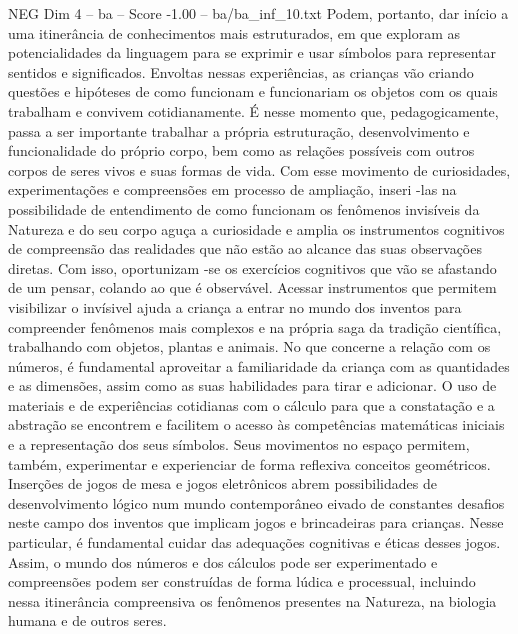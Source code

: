 \begin{textsample}{NEG Dim 4 – ba – Score -1.00 – ba/ba\_inf\_10.txt}
Podem, portanto, dar início a uma itinerância de conhecimentos mais estruturados, em que exploram as potencialidades da linguagem para se exprimir e usar símbolos para representar sentidos e significados.
Envoltas nessas experiências, as crianças vão criando questões e hipóteses de como funcionam e funcionariam os objetos com os quais trabalham e convivem cotidianamente.
É nesse momento que, pedagogicamente, passa a ser importante trabalhar a própria estruturação, desenvolvimento e funcionalidade do próprio corpo, bem como as relações possíveis com outros corpos de seres vivos e suas formas de vida.
Com esse movimento de curiosidades, experimentações e compreensões em processo de ampliação, inseri -las na possibilidade de entendimento de como funcionam os fenômenos invisíveis da Natureza e do seu corpo aguça a curiosidade e amplia os instrumentos cognitivos de compreensão das realidades que não estão ao alcance das suas observações diretas.
Com isso, oportunizam -se os exercícios cognitivos que vão se afastando de um pensar, colando ao que é observável.
Acessar instrumentos que permitem visibilizar o invísivel ajuda a criança a entrar no mundo dos inventos para compreender fenômenos mais complexos e na própria saga da tradição científica, trabalhando com objetos, plantas e animais.
No que concerne a relação com os números, é fundamental aproveitar a familiaridade da criança com as quantidades e as dimensões, assim como as suas habilidades para tirar e adicionar.
O uso de materiais e de experiências cotidianas com o cálculo para que a constatação e a abstração se encontrem e facilitem o acesso às competências matemáticas iniciais e a representação dos seus símbolos.
Seus movimentos no espaço permitem, também, experimentar e experienciar de forma reflexiva conceitos geométricos.
Inserções de jogos de mesa e jogos eletrônicos abrem possibilidades de desenvolvimento lógico num mundo contemporâneo eivado de constantes desafios neste campo dos inventos que implicam jogos e brincadeiras para crianças.
Nesse particular, é fundamental cuidar das adequações cognitivas e éticas desses jogos.
Assim, o mundo dos números e dos cálculos pode ser experimentado e compreensões podem ser construídas de forma lúdica e processual, incluindo nessa itinerância compreensiva os fenômenos presentes na Natureza, na biologia humana e de outros seres.

\end{textsample}
